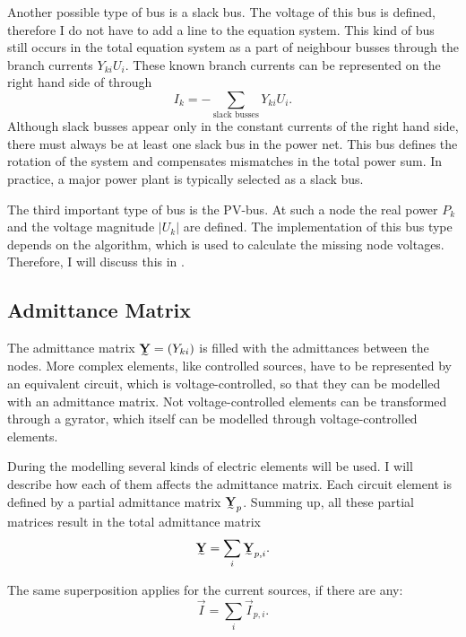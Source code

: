 Another possible type of bus is a slack bus. The voltage of this bus is defined, therefore I do not have to add a line to the equation system. This kind of bus still occurs in the total equation system as a part of neighbour busses through the branch currents $Y_{ki} U_i$. These known branch currents can be represented on the right hand side of  through
\begin{equation}
	I_k = -\sum_{\text{slack busses}} Y_{ki} U_i.
\end{equation}
Although slack busses appear only in the constant currents of the right hand side, there must always be at least one slack bus in the power net. This bus defines the rotation of the system and compensates mismatches in the total power sum. In practice, a major power plant is typically selected as a slack bus.

The third important type of bus is the PV-bus. At such a node the real power $P_k$ and the voltage magnitude $|U_k|$ are defined. The implementation of this bus type depends on the algorithm, which is used to calculate the missing node voltages. Therefore, I will discuss this in .

\subsection{Admittance Matrix}

The admittance matrix $\mat Y = (Y_{ki})$ is filled with the admittances between the nodes. More complex elements, like controlled sources, have to be represented by an equivalent circuit, which is voltage-controlled, so that they can be modelled with an admittance matrix. Not voltage-controlled elements can be transformed through a gyrator, which itself can be modelled through voltage-controlled elements.

During the modelling several kinds of electric elements will be used. I will describe how each of them affects the admittance matrix. Each circuit element is defined by a partial admittance matrix $\mat Y_p$. Summing up, all these partial matrices result in the total admittance matrix
\begin{equation}
	\mat Y = \sum_i \mat Y_{p,i}.
\end{equation}

The same superposition applies for the current sources, if there are any:
\begin{equation}
	\vec I = \sum_i \vec I_{p,i}.
\end{equation}

